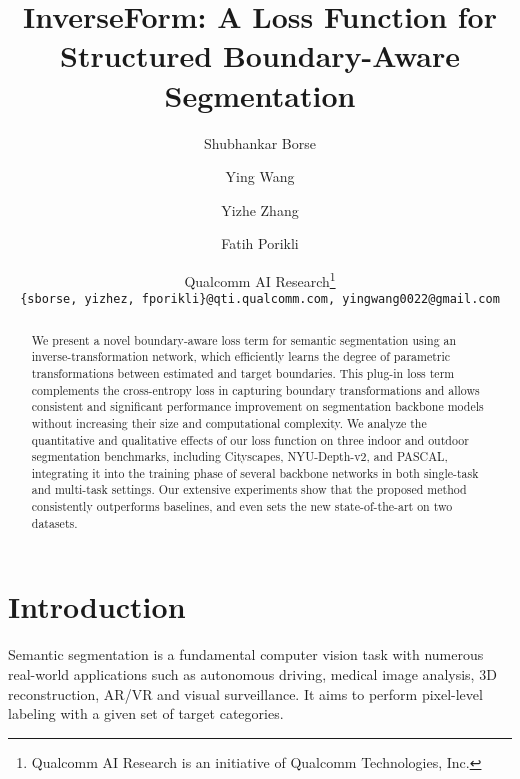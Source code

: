 \documentclass[final]{cvpr}
\begin{document}
\title{InverseForm: A Loss Function for Structured Boundary-Aware Segmentation  }

\author{
Shubhankar Borse
\and
Ying Wang
\and
Yizhe Zhang
\and
Fatih Porikli
\and
Qualcomm AI Research\thanks{Qualcomm AI Research is an initiative of Qualcomm Technologies, Inc.}\\
{\tt\small \{sborse, yizhez, fporikli\}@qti.qualcomm.com, yingwang0022@gmail.com}\\
}


\maketitle


\begin{abstract}
We present a novel boundary-aware loss term for semantic segmentation using an inverse-transformation network, which efficiently learns the degree of parametric transformations between estimated and target boundaries. This plug-in loss term complements the cross-entropy loss in capturing boundary transformations and allows consistent and significant performance improvement on segmentation backbone models without increasing their size and computational complexity. We analyze the quantitative and qualitative effects of our loss function on three indoor and outdoor segmentation benchmarks, including Cityscapes, NYU-Depth-v2, and PASCAL, integrating it into the training phase of several backbone networks in both single-task and multi-task settings. Our extensive experiments show that the proposed method consistently outperforms baselines, and even sets the new state-of-the-art on two datasets.
\end{abstract}

\section{Introduction}

Semantic segmentation is a fundamental computer vision task with numerous real-world applications such as autonomous driving, medical image analysis, 3D reconstruction, AR/VR and visual surveillance. It aims to perform pixel-level labeling with a given set of target categories. 
\end{document}
